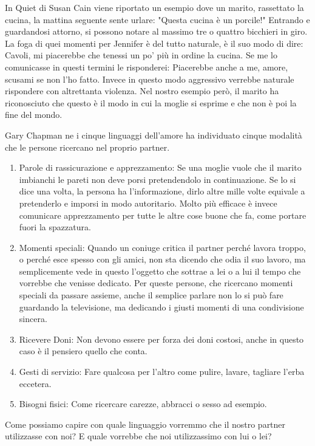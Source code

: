 \documentclass[12pt]{book} %
\begin{document}
In Quiet di Susan Cain viene riportato un esempio dove un marito,
rassettato la cucina, la mattina seguente sente urlare: "Questa cucina è un porcile!" Entrando e
guardandosi attorno, si possono notare al massimo tre o quattro bicchieri in giro. La foga di quei momenti per Jennifer
è del tutto naturale, è il suo modo di dire: Cavoli, mi piacerebbe che tenessi un po' più in ordine la cucina. Se me lo
comunicasse in questi termini le risponderei: Piacerebbe anche a me, amore, scusami se non l'ho fatto. Invece in questo
modo aggressivo verrebbe naturale rispondere con altrettanta violenza. Nel nostro esempio però, il marito ha
riconosciuto che questo è il modo in cui la moglie si esprime e che non è poi la fine del mondo.

Gary Chapman ne i cinque linguaggi dell'amore ha individuato cinque
modalità che le persone ricercano nel proprio partner.

\begin{enumerate}
\item Parole di rassicurazione e apprezzamento: Se una moglie vuole che il marito imbianchi le pareti non deve porsi
pretendendolo in continuazione. Se lo si dice una volta, la persona ha l'informazione, dirlo altre mille volte equivale a pretenderlo e
imporsi in modo autoritario. Molto più efficace è invece comunicare apprezzamento per tutte le altre
cose buone che fa, come portare fuori la spazzatura.
\item Momenti speciali: Quando un coniuge critica il partner perché lavora troppo, o perché esce spesso con gli amici,
non sta dicendo che odia il suo lavoro, ma semplicemente vede in questo l'oggetto che sottrae a
lei o a lui il tempo che vorrebbe che venisse dedicato. Per queste persone, che ricercano momenti speciali da passare
assieme, anche il semplice parlare non lo si può fare guardando la televisione, ma dedicando i giusti momenti di una
condivisione sincera.
\item Ricevere Doni: Non devono essere per forza dei doni costosi, anche in questo caso è il pensiero quello che conta.
\item Gesti di servizio: Fare qualcosa per l'altro come pulire, lavare, tagliare l'erba eccetera.
\item Bisogni fisici: Come ricercare carezze, abbracci o sesso ad esempio. 
\end{enumerate}
Come possiamo capire con quale linguaggio vorremmo che il nostro partner utilizzasse con noi? E quale vorrebbe che noi
utilizzassimo con lui o lei?
\end{document}
